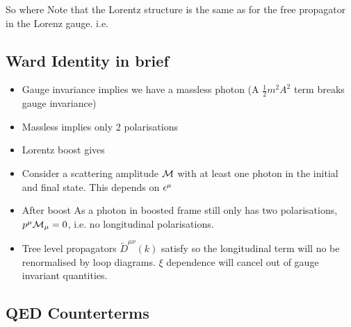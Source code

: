 \documentclass{article}
\begin{document}
So 
where 
Note that the Lorentz structure is the same as for the free propagator in the Lorenz gauge. i.e.

\subsection{Ward Identity in brief}
\begin{itemize}
    \item Gauge invariance implies we have a massless photon (A $\frac{1}{2}m^2 A^2$ term breaks gauge invariance)
    \item Massless implies only 2 polarisations
    \item Lorentz boost gives 
    \item Consider a scattering amplitude $\mathcal{M}$ with at least one photon in the initial and final state. This depends on $\epsilon^\mu$
    \item After boost 
    As a photon in boosted frame still only has two polarisations, $p^\mu \mathcal{M}_\mu = 0$, i.e. no longitudinal polarisations. 
    \item Tree level propagators $\tilde{D}^{\mu\nu}(k)$ satisfy 
    so the longitudinal term will no be renormalised by loop diagrams. $\xi$ dependence will cancel out of gauge invariant quantities. 
\end{itemize}

\subsection{QED Counterterms}
\end{document}
